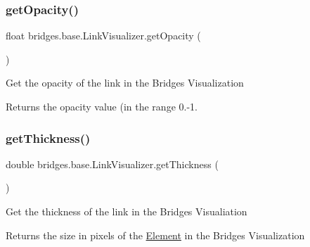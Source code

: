 \mbox{\label{classbridges_1_1base_1_1_link_visualizer_a07cdd435a54e4b612ad63614f2a27a4a}} 
\subsubsection{\texorpdfstring{getOpacity()}{getOpacity()}}
{\footnotesize\ttfamily float bridges.\+base.\+Link\+Visualizer.\+get\+Opacity (\begin{DoxyParamCaption}{ }\end{DoxyParamCaption})}

Get the opacity of the link in the Bridges Visualization

\begin{DoxyReturn}{Returns}
the opacity value (in the range 0.-\/1. 
\end{DoxyReturn}
\mbox{\label{classbridges_1_1base_1_1_link_visualizer_af1592d2a8664b00c1a51fdc0f8d1860a}} 
\subsubsection{\texorpdfstring{getThickness()}{getThickness()}}
{\footnotesize\ttfamily double bridges.\+base.\+Link\+Visualizer.\+get\+Thickness (\begin{DoxyParamCaption}{ }\end{DoxyParamCaption})}

Get the thickness of the link in the Bridges Visualiation

\begin{DoxyReturn}{Returns}
the size in pixels of the \mbox{\hyperlink{classbridges_1_1base_1_1_element}{Element}} in the Bridges Visualization 
\end{DoxyReturn}
\mbox{\label{classbridges_1_1base_1_1_link_visualizer_ac96d7fb118ae6c7e1bdd57c5e2c8639a}} 
